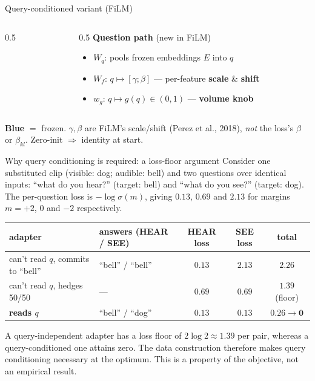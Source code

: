 \documentclass[aspectratio=169,11pt]{beamer}
\begin{document}
\begin{frame}{Query-conditioned variant (FiLM)}
\begin{columns}[T]
\begin{column}{0.5\textwidth}
\begin{itemize}
\end{itemize}
\end{column}
\begin{column}{0.5\textwidth}
{\scriptsize \textcolor{trn}{\textbf{Question path}} {\normalfont(new in FiLM)}}
\begin{itemize}\scriptsize\setlength\itemsep{1pt}
\item $W_q$: pools frozen embeddings $E$ into $q$
\item $W_{\!f}$: $q\mapsto[\gamma;\beta]$ --- per-feature \textbf{scale} \& \textbf{shift}
\item $w_g$: $q\mapsto g(q)\!\in\!(0,1)$ --- \textbf{volume knob}
\end{itemize}
\end{column}
\end{columns}
\vspace{2pt}
{\scriptsize \textcolor{frz}{\textbf{Blue} $=$ frozen}. $\gamma,\beta$ are FiLM's scale/shift (Perez
et al., 2018), \emph{not} the loss's $\beta$ or $\beta_{kl}$. Zero-init $\Rightarrow$ identity at start.}
\end{frame}

\begin{frame}{Why query conditioning is required: a loss-floor argument}
{\footnotesize Consider one substituted clip (visible: dog; audible: bell) and two questions over
identical inputs: ``what do you hear?'' (target: bell) and ``what do you see?'' (target: dog). The
per-question loss is $-\log\sigma(m)$, giving $0.13$, $0.69$ and $2.13$ for margins
$m = +2$, $0$ and $-2$ respectively.}
\vspace{0.4em}
\centering
\renewcommand{\arraystretch}{1.15}
\footnotesize
\begin{tabular}{l l cc c}
\toprule
adapter & answers (HEAR / SEE) & HEAR loss & SEE loss & total \\
\midrule
can't read $q$, commits to ``bell'' & ``bell'' / ``bell'' & $0.13$ & $2.13$ & $2.26$ \\
can't read $q$, hedges 50/50        & --- & $0.69$ & $0.69$ & $\mathbf{1.39}$ (floor) \\
\textbf{reads $q$}                  & ``bell'' / ``dog''  & $0.13$ & $0.13$ & $\mathbf{0.26\to 0}$ \\
\bottomrule
\end{tabular}
\vspace{0.5em}
\par
{\footnotesize A query-independent adapter has a loss floor of $2\log 2 \approx 1.39$ per pair, whereas a
query-conditioned one attains zero. The data construction therefore makes query conditioning
necessary at the optimum. This is a property of the objective, not an empirical result.}
\end{frame}
\end{document}
